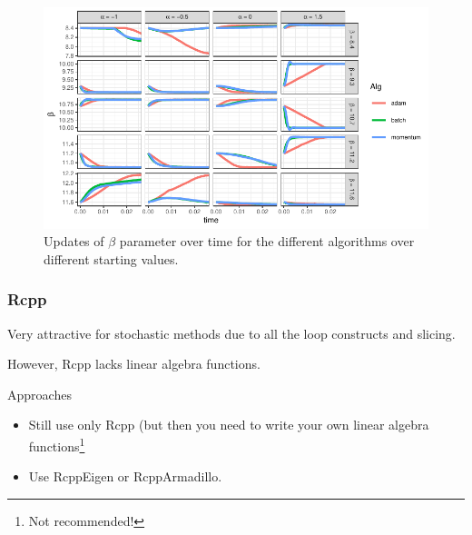 \documentclass[aspectratio=1610,onlytextwidth]{beamer}
\begin{document}
\begin{frame}[c]
  \begin{figure}[htpb]
    \centering
    \includegraphics[]{images/nonlinear-beta.pdf}
    \caption{%
      Updates of \(\beta\) parameter over time for the different algorithms over
      different starting values.
    }
  \end{figure}
\end{frame}

\begin{frame}[c]
  \frametitle{Rcpp}

  Very attractive for stochastic methods due to all the loop constructs and slicing.

  \medskip

  However, Rcpp lacks linear algebra functions.

  \begin{block}{Approaches}
    \begin{itemize}
      \item Still use only Rcpp (but then you need to write your own linear algebra functions\footnote{Not recommended!}
      \item Use RcppEigen or RcppArmadillo.
    \end{itemize}
  \end{block}
\end{frame}
\end{document}
